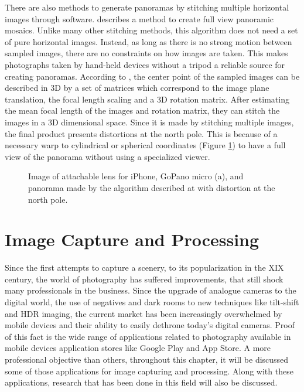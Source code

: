 There are also methods to generate panoramas by stitching multiple horizontal images through software. \citeauthor{Szeliski} \cite{Szeliski} describes a method to create full view panoramic mosaics. 
Unlike many other stitching methods, this algorithm does not need a set of pure horizontal images. Instead, as long as there is no strong motion between sampled images, there are no constraints on how images are taken. This makes photographs taken by hand-held devices without a tripod a reliable source for creating panoramas. According to \citeauthor{Szeliski}, the center point of the sampled images can be described in 3D by a set of matrices which correspond to the image plane translation, the focal length scaling and a 3D rotation matrix. After estimating the mean focal length of the images and rotation matrix, they can stitch the images in a 3D dimensional space.
Since it is made by stitching multiple images, the final product presents distortions at the north pole. This is because of a necessary warp to cylindrical or spherical coordinates (Figure \ref{fig:panoramic_image}) to have a full view of the panorama without using a specialized viewer.

\begin{figure}[htbp]
        \centering
  \caption{Image of attachable lens for iPhone, GoPano micro (a), and panorama made by the algorithm described at \cite{Szeliski} with distortion at the north pole.}
  \label{fig:panoramic_image}
\end{figure}


\section{Image Capture and Processing}
\label{sub:capturing_processing}

Since the first attempts to capture a scenery, to its popularization in the XIX century, the world of photography has suffered improvements, that still shock many professionals in the business. Since the upgrade of analogue cameras to the digital world, the use of negatives and dark rooms to new techniques like tilt-shift and HDR imaging, the current market has been increasingly overwhelmed by mobile devices and their ability to easily dethrone today's digital cameras. Proof of this fact is the wide range of applications related to photography available in mobile devices application stores like Google Play and App Store. A more professional objective than others, throughout this chapter, it will be discussed some of those applications for image capturing and processing. Along with these applications, research that has been done in this field will also be discussed.

